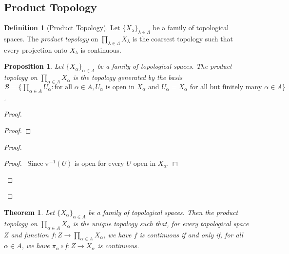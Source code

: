 \documentclass{book}
\let\qed\relax
\newtheorem{prop}[ax]{Proposition}
\newtheorem{thm}[ax]{Theorem}
\theoremstyle{definition}
\newtheorem{df}[ax]{Definition}
\newcommand{\inv}[1]{\ensuremath{{#1}^{-1}}}
\begin{document}
\subsection{Product Topology}

\begin{df}[Product Topology]
Let $\{ X_\lambda \}_{\lambda \in \Lambda}$ be a family of topological spaces. The \emph{product topology} on $\prod_{\lambda \in \Lambda} X_\lambda$ is the coarsest topology such that every projection onto $X_\lambda$ is continuous.
\end{df}

\begin{prop}
Let $\{ X_\alpha \}_{\alpha \in A}$ be a family of topological spaces. The product topology on $\prod_{\alpha \in A} X_\alpha$ is the topology generated by the basis $\mathcal{B} = \{ \prod_{\alpha \in A} U_\alpha : \text{for all } \alpha \in A, U_\alpha \text{ is open in } X_\alpha \text{ and } U_\alpha = X_\alpha \text{ for all but finitely many } \alpha \in A \}$.
\end{prop}

\begin{proof}
\pf
{}
\begin{proof}
	\step{c}{$B = \inv{\pi_{\alpha_1}}(U_{\alpha_1}) \cap \cdots \cap \inv{\pi_{\alpha_n}}(U_{\alpha_n})$}
\end{proof}
\begin{proof}
	\begin{proof}
		\pf\ Since $\inv{\pi}(U)$ is open for every $U$ open in $X_\alpha$.
	\end{proof}
\end{proof}
\qed
\end{proof}

\begin{thm}
\label{thm:product_universal}
Let $\{ X_\alpha \}_{\alpha \in A}$ be a family of topological spaces. Then the product topology on $\prod_{\alpha \in A} X_\alpha$ is the unique topology such that, for every topological space $Z$ and function $f : Z \rightarrow \prod_{\alpha \in A} X_\alpha$, we have $f$ is continuous if and only if, for all $\alpha \in A$, we have $\pi_\alpha \circ f : Z \rightarrow X_\alpha$ is continuous.
\end{thm}
\end{document}
